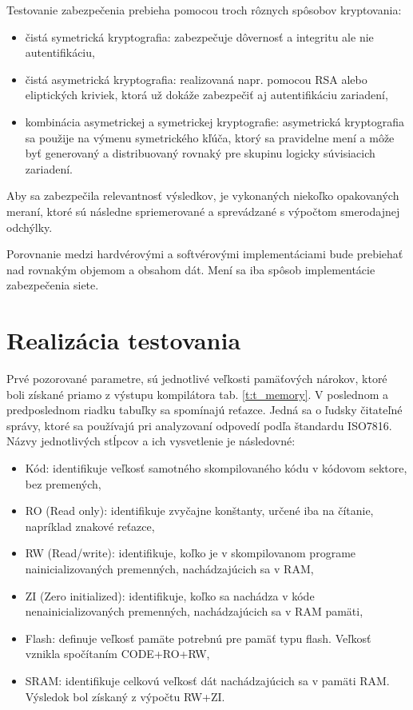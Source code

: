\documentclass[12pt,a4wide,oneside,openright]{report}
\begin{document}
Testovanie zabezpečenia prebieha pomocou troch rôznych spôsobov kryptovania:
\singlespacing
\begin{itemize}
	\item čistá symetrická kryptografia: zabezpečuje dôvernosť a integritu ale nie autentifikáciu,
	\item čistá asymetrická kryptografia: realizovaná napr. pomocou RSA alebo eliptických kriviek, ktorá už dokáže zabezpečiť aj autentifikáciu zariadení,
	\item kombinácia asymetrickej a symetrickej kryptografie: asymetrická kryptografia sa použije na výmenu symetrického kľúča, ktorý sa pravidelne mení a môže byť generovaný a distribuovaný rovnaký pre skupinu logicky súvisiacich zariadení.
\end{itemize}
\onehalfspacing


Aby sa zabezpečila relevantnosť výsledkov, je vykonaných niekoľko opakovaných meraní, ktoré sú následne spriemerované a sprevádzané s výpočtom smerodajnej odchýlky.

Porovnanie medzi hardvérovými a softvérovými implementáciami bude prebiehať nad rovnakým objemom a obsahom dát. Mení sa iba spôsob implementácie zabezpečenia siete.

\section{Realizácia testovania}

Prvé pozorované parametre, sú jednotlivé veľkosti pamäťových nárokov, ktoré boli získané priamo z výstupu kompilátora tab. \ref{t:t_memory}. V poslednom a predposlednom riadku tabuľky sa spomínajú reťazce. Jedná sa o ľudsky čitateľné správy, ktoré sa používajú pri analyzovaní odpovedí podľa štandardu ISO7816. Názvy jednotlivých stĺpcov a ich vysvetlenie je následovné:
\singlespacing
\begin{itemize}
	\item Kód: identifikuje veľkosť samotného skompilovaného kódu v kódovom sektore, bez premených,
	\item RO (Read only): identifikuje zvyčajne konštanty, určené iba na čítanie, napríklad znakové reťazce,
	\item RW (Read/write): identifikuje, koľko je v skompilovanom programe nainicializovaných premenných, nachádzajúcich sa v RAM,
	\item ZI (Zero initialized): identifikuje, koľko sa nachádza v kóde nenainicializovaných premenných, nachádzajúcich sa v RAM pamäti,
	\item Flash: definuje veľkosť pamäte potrebnú pre pamäť typu flash. Veľkosť vznikla spočítaním CODE+RO+RW,
	\item SRAM: identifikuje celkovú veľkosť dát nachádzajúcich sa v pamäti RAM. Výsledok bol získaný z výpočtu RW+ZI.
\end{itemize}
\onehalfspacing
\end{document}
